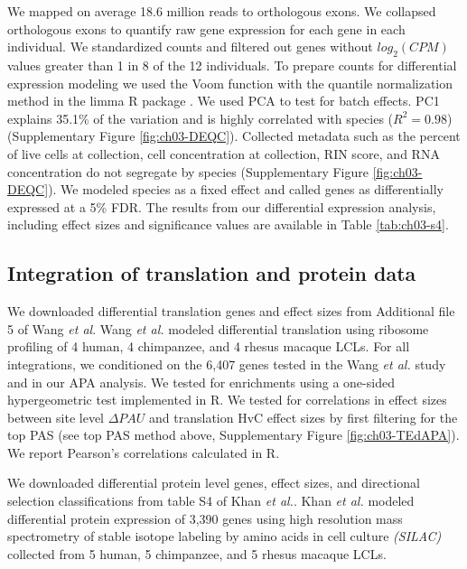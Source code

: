 We mapped on average 18.6 million reads to orthologous exons. We collapsed orthologous exons to quantify raw gene expression for each gene in each individual. We standardized counts and filtered out genes without $log_{2}(CPM)$ values greater than 1 in 8 of the 12 individuals. To prepare counts for differential expression modeling we used the Voom function with the quantile normalization method in the limma R package \citep{ritchie_limma_2015}. We used PCA to test for batch effects. PC1 explains 35.1\% of the variation and is highly correlated with species ($R^{2}= 0.98$) (Supplementary Figure \ref{fig:ch03-DEQC}). Collected metadata such as the percent of live cells at collection, cell concentration at collection, RIN score, and RNA concentration do not segregate by species (Supplementary Figure \ref{fig:ch03-DEQC}). We modeled species as a fixed effect and called genes as differentially expressed at a 5\% FDR. The results from our differential expression analysis, including effect sizes and significance values are available in Table \ref{tab:ch03-s4}. 



\subsection{Integration of translation and protein data}\label{dTdP} 

We downloaded differential translation genes and effect sizes from Additional file 5 of Wang \emph{et al}\citep{wang_post-translational_2018}. Wang \emph{et al.} modeled differential translation using ribosome profiling of 4 human, 4 chimpanzee, and 4 rhesus macaque LCLs. For all integrations, we conditioned on the 6,407 genes tested in the Wang \emph{et al.} study and in our APA analysis. We tested for enrichments using a one-sided hypergeometric test implemented in R. We tested for correlations in effect sizes between site level $\Delta PAU$ and translation HvC effect sizes by first filtering for the top PAS (see top PAS method above, Supplementary Figure \ref{fig:ch03-TEdAPA}). We report Pearson's correlations calculated in R. 

We downloaded differential protein level genes, effect sizes, and directional selection classifications from table S4 of Khan \emph{et al.}\citep{khan_primate_2013}. Khan \emph{et al.} modeled differential protein expression of 3,390 genes using high resolution mass spectrometry of stable isotope labeling by amino acids in cell culture \emph{(SILAC)} collected from 5 human, 5 chimpanzee, and 5 rhesus macaque LCLs. 

